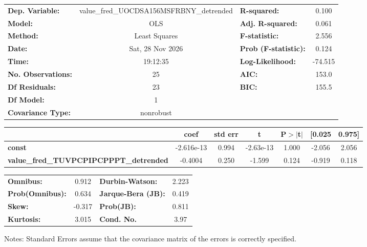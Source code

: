 \begin{center}
\begin{tabular}{lclc}
\toprule
\textbf{Dep. Variable:}                        & value\_fred\_UOCDSA156MSFRBNY\_detrended & \textbf{  R-squared:         } &     0.100   \\
\textbf{Model:}                                &                   OLS                    & \textbf{  Adj. R-squared:    } &     0.061   \\
\textbf{Method:}                               &              Least Squares               & \textbf{  F-statistic:       } &     2.556   \\
\textbf{Date:}                                 &             Sat, 28 Nov 2026             & \textbf{  Prob (F-statistic):} &    0.124    \\
\textbf{Time:}                                 &                 19:12:35                 & \textbf{  Log-Likelihood:    } &   -74.515   \\
\textbf{No. Observations:}                     &                      25                  & \textbf{  AIC:               } &     153.0   \\
\textbf{Df Residuals:}                         &                      23                  & \textbf{  BIC:               } &     155.5   \\
\textbf{Df Model:}                             &                       1                  & \textbf{                     } &             \\
\textbf{Covariance Type:}                      &                nonrobust                 & \textbf{                     } &             \\
\bottomrule
\end{tabular}
\begin{tabular}{lcccccc}
                                               & \textbf{coef} & \textbf{std err} & \textbf{t} & \textbf{P$> |$t$|$} & \textbf{[0.025} & \textbf{0.975]}  \\
\midrule
\textbf{const}                                 &   -2.616e-13  &        0.994     & -2.63e-13  &         1.000        &       -2.056    &        2.056     \\
\textbf{value\_fred\_TUVPCPIPCPPPT\_detrended} &      -0.4004  &        0.250     &    -1.599  &         0.124        &       -0.919    &        0.118     \\
\bottomrule
\end{tabular}
\begin{tabular}{lclc}
\textbf{Omnibus:}       &  0.912 & \textbf{  Durbin-Watson:     } &    2.223  \\
\textbf{Prob(Omnibus):} &  0.634 & \textbf{  Jarque-Bera (JB):  } &    0.419  \\
\textbf{Skew:}          & -0.317 & \textbf{  Prob(JB):          } &    0.811  \\
\textbf{Kurtosis:}      &  3.015 & \textbf{  Cond. No.          } &     3.97  \\
\bottomrule
\end{tabular}
\end{center}

Notes: \newline
 [1] Standard Errors assume that the covariance matrix of the errors is correctly specified.